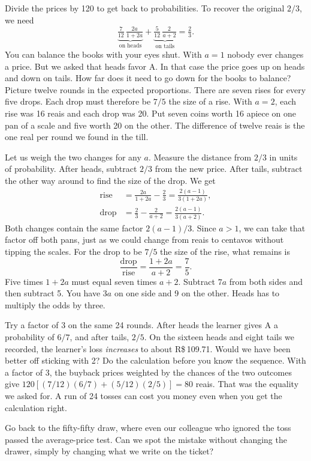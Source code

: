 Divide the prices by 120 to get back to probabilities. To recover the original $2/3$, we need
\[
\underbrace{\tfrac{7}{12}\,\tfrac{2a}{1+2a}}_{\text{on heads}}
+\underbrace{\tfrac{5}{12}\,\tfrac{2}{a+2}}_{\text{on tails}}
=\tfrac{2}{3}.
\]
You can balance the books with your eyes shut. With $a=1$ nobody ever changes a price. But we asked that heads favor A. In that case the price goes up on heads and down on tails. How far does it need to go down for the books to balance? Picture twelve rounds in the expected proportions. There are seven rises for every five drops. Each drop must therefore be $7/5$ the size of a rise. With $a=2$, each rise was 16 reais and each drop was 20. Put seven coins worth 16 apiece on one pan of a scale and five worth 20 on the other. The difference of twelve reais is the one real per round we found in the till.

Let us weigh the two changes for any $a$. Measure the distance from $2/3$ in units of probability. After heads, subtract $2/3$ from the new price. After tails, subtract the other way around to find the size of the drop. We get
\[
 \begin{aligned}
 \text{rise}&=\frac{2a}{1+2a}-\frac23=\frac{2(a-1)}{3(1+2a)},\\[4pt]
 \text{drop}&=\frac23-\frac{2}{a+2}=\frac{2(a-1)}{3(a+2)}.
 \end{aligned}
\]
Both changes contain the same factor $2(a-1)/3$. Since $a>1$, we can take that factor off both pans, just as we could change from reais to centavos without tipping the scales. For the drop to be $7/5$ the size of the rise, what remains is
\[
 \frac{\text{drop}}{\text{rise}}=\frac{1+2a}{a+2}=\frac75.
\]
Five times $1+2a$ must equal seven times $a+2$. Subtract $7a$ from both sides and then subtract 5. You have $3a$ on one side and 9 on the other. Heads has to multiply the odds by three.

Try a factor of 3 on the same 24 rounds. After heads the learner gives A a probability of $6/7$, and after tails, $2/5$. On the sixteen heads and eight tails we recorded, the learner's loss \emph{increases} to about R\$\,109.71. Would we have been better off sticking with 2? Do the calculation before you know the sequence. With a factor of 3, the buyback prices weighted by the chances of the two outcomes give $120[(7/12)(6/7)+(5/12)(2/5)]=80$ reais. That was the equality we asked for. A run of 24 tosses can cost you money even when you get the calculation right.

Go back to the fifty-fifty draw, where even our colleague who ignored the toss passed the average-price test. Can we spot the mistake without changing the drawer, simply by changing what we write on the ticket?

